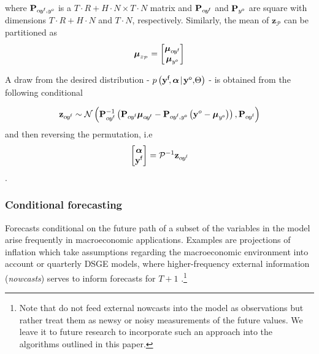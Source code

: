 \documentclass[notitlepage,a4paper,12pt]{article}
\begin{document}
where $\mathbf{P}_{\alpha\! y^{\sf{f}}, y^{\sf{o}}}$ is a 
$T\!\cdot\!R + H\!\cdot\!N \times T\!\cdot\!N$ matrix and $\mathbf{P}_{\alpha\! y^{\sf{f}}}$ and $\mathbf{P}_{y^{\sf{o}}}$ are square with dimensions $T\!\cdot\!R + H\!\cdot\!N$ and $T\!\cdot\!N $, respectively. Similarly, the mean of $\mathbf{z}_{\mathcal{P}}$ can be partitioned as 
$$
\boldsymbol{\mu}_{z_{\mathcal{P}}} = 
\begin{bmatrix}
    \boldsymbol{\mu}_{\alpha\! y^{\sf{f}}} \\
    \boldsymbol{\mu}_{y^{\sf{o}}}
\end{bmatrix}
$$

A draw from the desired distribution - $p\left(\mathbf{y}^{\sf{f}}\!,\boldsymbol{\alpha}\!\mid\! \mathbf{y}^{\sf{o}},\!\Theta \right)$ - is obtained from the following conditional 

\begin{equation*}
    \mathbf{z}_{\alpha\! y^{\sf{f}}} \sim 
    \mathcal{N}\left(
        \mathbf{P}^{-1}_{\alpha\! y^{\sf{f}}}\left( \mathbf{P}_{\alpha\! y^{\sf{f}}}\boldsymbol{\mu}_{\alpha\! y^{\sf{f}}} - \mathbf{P}_{\alpha\! y^{\sf{f}}, y^{\sf{o}}}\left(\mathbf{y}^o-\boldsymbol{\mu}_{y^{\sf{o}}}\right)\right)
    ,
    \mathbf{P}_{\alpha\! y^{\sf{f}}}
    \right)
\end{equation*}
and then reversing the permutation, i.e 
$$
\begin{bmatrix}
    \boldsymbol{\alpha} \\
    \mathbf{y^{\sf{f}}}
\end{bmatrix}
= 
\mathcal{P}^{-1} \mathbf{z}_{\alpha\! y^{\sf{f}}}
$$.

\subsubsection{Conditional forecasting}\label{sec:condfcast}

Forecasts conditional on the future path of a subset of the variables in the model arise frequently in macroeconomic applications. Examples are projections of inflation which take assumptions regarding the macroeconomic environment into account \citep{giannone_etal_2014_ijf} or quarterly DSGE models, where higher-frequency external information (\textit{nowcasts}) serves to inform forecasts for $T+1$ \citep{delnegro_schorfheide_2013_hb}.\footnote{Note that \citet{delnegro_schorfheide_2013_hb} do not feed external nowcasts into the model as observations but rather treat them as newsy or noisy measurements of the future values. We leave it to future research to incorporate such an approach into the algorithms outlined in this paper.}
\end{document}
